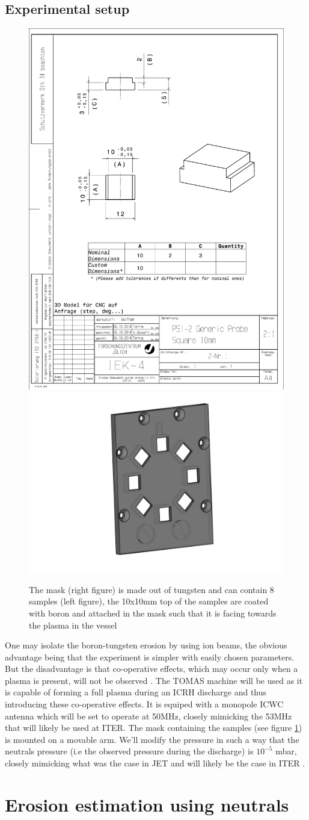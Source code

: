 \documentclass{article}
\begin{document}
\subsection{Experimental setup}
\begin{figure}[ht]
    \centering
    \includegraphics[height=0.33\textwidth]{figures/Sample.pdf}
    \includegraphics[height=0.33\textwidth]{figures/mask.pdf}
    \caption{The mask (right figure) is made out of tungsten and can contain 8 samples (left figure), 
    the 10x10mm top of the samples are coated with boron and attached in the mask such that it is facing towards    the plasma in the vessel}
    \label{fig:samples+mask}
\end{figure}
One may isolate the boron-tungsten erosion by using ion beams, the obvious
advantage being that the experiment is simpler with easily chosen parameters.
But the disadvantage is that co-operative effects, which may occur only when a
plasma is present, will not be observed \cite{McCRACKEN}. The TOMAS machine
\cite{TOMAS} will be used as it is capable of forming a full plasma during an
ICRH discharge and thus introducing these co-operative effects.  It is equiped
with a monopole ICWC antenna which will be set to operate at 50MHz, closely
mimicking the 53MHz that will likely be used at ITER.  The mask containing the
samples (see figure \ref{fig:samples+mask}) is mounted on a movable arm.  We'll
modify the pressure in such a way that the neutrals pressure (i.e the observed
pressure during the discharge) is $10^{-5}$ mbar, closely mimicking what was
the case in JET and will likely be the case in ITER \cite{DOUAI}.
\section{Erosion estimation using neutrals}
\end{document}
